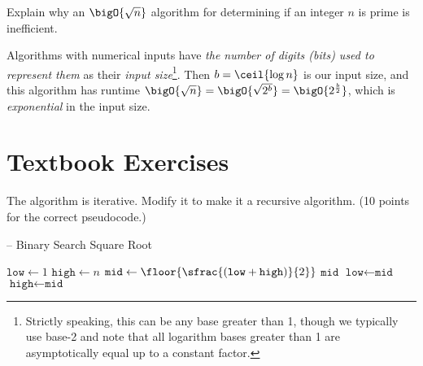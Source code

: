 \documentclass[draft]{article}
\begin{document}
\begin{question}
    Explain why an $\bigO{\sqrt{n}}$ algorithm for determining if an integer $n$ is prime is inefficient.
\end{question}

\begin{solution}
    Algorithms with numerical inputs have \emph{the number of digits (bits) used to represent them} as their \emph{input size}\footnote{Strictly speaking, this can be any base greater than 1, though we typically use base-2 and note that all logarithm bases greater than 1 are asymptotically equal up to a constant factor.}. Then $b = \ceil{\log{n}}$ is our input size, and this algorithm has runtime $\bigO{\sqrt{n}} = \bigO{\sqrt{2^b}} = \bigO{2^{\frac{b}{2}}}$, which is \emph{exponential} in the input size.
\end{solution}

\section{Textbook Exercises}
\begin{exercise}{2.3}
    The algorithm  is iterative. Modify it to make it a recursive algorithm.
    (10 points for the correct pseudocode.)

    \begin{algorithm}[H]
        \caption[]{ -- Binary Search Square Root}
        \label{alg:binsqrt}
        \begin{algorithmic}[1]
            \State $\texttt{low} \gets 1$   
            \State $\texttt{high} \gets n$  
            \While{\True}
            \State $\texttt{mid} \gets \floor{\sfrac{(\texttt{low} + \texttt{high})}{2}}$   
            \State \Return $\texttt{mid}$
             
            \State $\texttt{low} \gets \texttt{mid}$
            \Else {}
            \State $\texttt{high} \gets \texttt{mid}$
            \EndIf
            \EndWhile
            \EndFunction
        \end{algorithmic}
    \end{algorithm}
\end{exercise}
\end{document}
